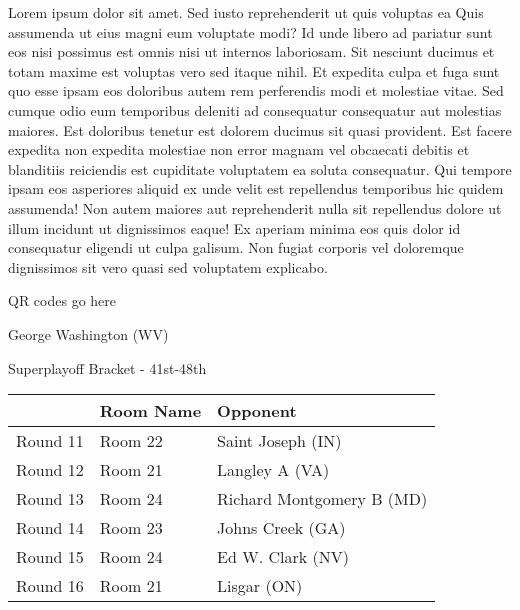 \documentclass{article}%
\begin{document}
\vspace*{8pt}%
\linebreak%
\newline%
\newline%
    Lorem ipsum dolor sit amet. Sed iusto reprehenderit ut quis voluptas ea Quis assumenda ut eius magni eum voluptate modi? Id unde libero ad pariatur sunt eos nisi possimus est omnis nisi ut internos laboriosam. Sit nesciunt ducimus et totam maxime est voluptas vero sed itaque nihil. Et expedita culpa et fuga sunt quo esse ipsam eos doloribus autem rem perferendis modi et molestiae vitae.\newline%
\newline%
    Sed cumque odio eum temporibus deleniti ad consequatur consequatur aut molestias maiores. Est doloribus tenetur est dolorem ducimus sit quasi provident. Est facere expedita non expedita molestiae non error magnam vel obcaecati debitis et blanditiis reiciendis est cupiditate voluptatem ea soluta consequatur. Qui tempore ipsam eos asperiores aliquid ex unde velit est repellendus temporibus hic quidem assumenda!\newline%
\newline%
    Non autem maiores aut reprehenderit nulla sit repellendus dolore ut illum incidunt ut dignissimos eaque! Ex aperiam minima eos quis dolor id consequatur eligendi ut culpa galisum. Non fugiat corporis vel doloremque dignissimos sit vero quasi sed voluptatem explicabo.\newline%
\newline%
\vspace*{30pt}%
\begin{center}%
\begin{Huge}%
QR codes go here%
\end{Huge}%
\end{center}%
\newpage%
\begin{center}%
\begin{Huge}%
George Washington (WV)%
\end{Huge}%
\vspace*{8pt}%
\linebreak%
\begin{Large}%
Superplayoff Bracket {-} 41st{-}48th%
\end{Large}%
\end{center}%
%
\begin{tabularx}{\textwidth}{|c|Y|Y|}%
\hline%
&Room Name&Opponent\\%
\hline%
Round 11&Room 22&Saint Joseph (IN)\\%
Round 12&Room 21&Langley A (VA)\\%
Round 13&Room 24&Richard Montgomery B (MD)\\%
Round 14&Room 23&Johns Creek (GA)\\%
Round 15&Room 24&Ed W. Clark (NV)\\%
Round 16&Room 21&Lisgar (ON)\\%
\hline%
\end{tabularx}%
\end{document}
